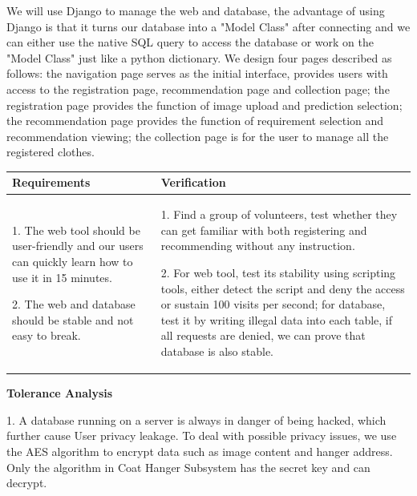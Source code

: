 We will use Django to manage the web and database, the advantage of using Django is that it turns our database into a "Model Class" after connecting and we can either use the native SQL query to access the database or work on the "Model Class" just like a python dictionary. We design four pages described as follows: the navigation page serves as the initial interface, provides users with access to the registration page, recommendation page and collection page; the registration page provides the function of image upload and prediction selection; the recommendation page provides the function of requirement selection and recommendation viewing; the collection page is for the user to manage all the registered clothes.  
\clearpage

\begin{table}[h]
    \centering
    \begin{tabularx}{\textwidth}{|X|X|}
    \hline
    Requirements & Verification \\
    \hline
    1. The web tool should be user-friendly and our users can quickly learn how to use it in 15 minutes.
    
    2. The web and database should be stable and not easy to break.
    & 
    1. Find a group of volunteers, test whether they can get familiar with both registering and recommending without any instruction.
    
    2. For web tool, test its stability using scripting tools, either detect the script and deny the access or sustain 100 visits per second; for database, test it by writing illegal data into each table, if all requests are denied, we can prove that database is also stable. 
    \\
    \hline
    \end{tabularx}
\end{table}

\noindent\textbf{Tolerance Analysis} 


 1. A database running on a server is always in danger of being hacked, which further cause User privacy leakage. To deal with possible privacy issues, we use the AES algorithm to encrypt data such as image content and hanger address. Only the algorithm in Coat Hanger Subsystem has the secret key and can decrypt.